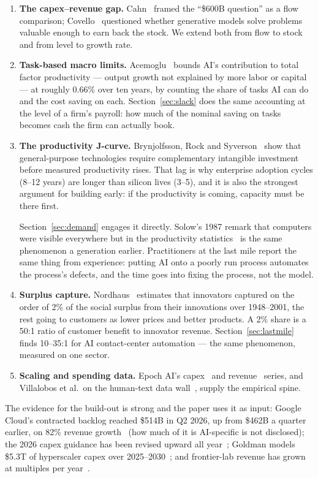 \documentclass[11pt,letterpaper]{article}
\begin{document}
\begin{enumerate}
    \item \textbf{The capex--revenue gap.} Cahn~\cite{ref:cahn2024} framed the ``\$600B question'' as a flow comparison; Covello~\cite{ref:covello2024} questioned whether generative models solve problems valuable enough to earn back the stock. We extend both from flow to stock and from level to growth rate.
    \item \textbf{Task-based macro limits.} Acemoglu~\cite{ref:acemoglu2024} bounds AI's contribution to total factor productivity --- output growth not explained by more labor or capital --- at roughly 0.66\% over ten years, by counting the share of tasks AI can do and the cost saving on each. Section~\ref{sec:slack} does the same accounting at the level of a firm's payroll: how much of the nominal saving on tasks becomes cash the firm can actually book.
    \item \textbf{The productivity J-curve.} Brynjolfsson, Rock and Syverson~\cite{ref:brynjolfsson2021} show that general-purpose technologies require complementary intangible investment before measured productivity rises. That lag is why enterprise adoption cycles (8--12 years) are longer than silicon lives (3--5), and it is also the strongest argument for building early: if the productivity is coming, capacity must be there first.

    Section~\ref{sec:demand} engages it directly. Solow's 1987 remark that computers were visible everywhere but in the productivity statistics~\cite{ref:solow1987} is the same phenomenon a generation earlier. Practitioners at the last mile report the same thing from experience: putting AI onto a poorly run process automates the process's defects, and the time goes into fixing the process, not the model.
    \item \textbf{Surplus capture.} Nordhaus~\cite{ref:nordhaus2004} estimates that innovators captured on the order of 2\% of the social surplus from their innovations over 1948--2001, the rest going to customers as lower prices and better products. A 2\% share is a 50:1 ratio of customer benefit to innovator revenue. Section~\ref{sec:lastmile} finds 10--35:1 for AI contact-center automation --- the same phenomenon, measured on one sector.
    \item \textbf{Scaling and spending data.} Epoch AI's capex~\cite{ref:epoch_capex} and revenue~\cite{ref:epoch_revenue} series, and Villalobos et al.\ on the human-text data wall~\cite{ref:epoch_data2024}, supply the empirical spine.
\end{enumerate}
The evidence for the build-out is strong and the paper uses it as input: Google Cloud's contracted backlog reached \$514B in Q2 2026, up from \$462B a quarter earlier, on 82\% revenue growth~\cite{ref:alphabet_q2_2026} (how much of it is AI-specific is not disclosed); the 2026 capex guidance has been revised upward all year~\cite{ref:mlq2026,ref:statista2026}; Goldman models \$5.3T of hyperscaler capex over 2025--2030~\cite{ref:yahoo_goldman2026}; and frontier-lab revenue has grown at multiples per year~\cite{ref:epoch_revenue}.
\end{document}
